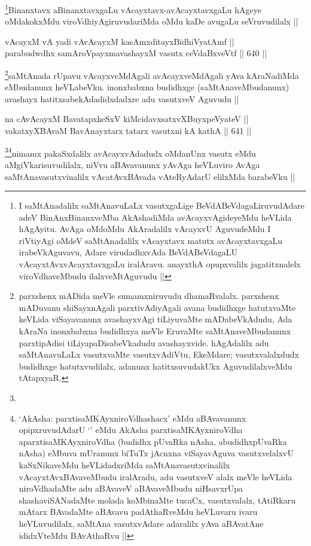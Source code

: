 \begin{artha}
\footnote{I saMtAnadalilx saMtAnavuLaLx vasutxgaLige BeVdABeVdagaLiruvudAdare adeV BinAnxBinanxveMba AkAshadiMda avAcayxvAgideyeMdu heVLida hAgAyitu. AvAga oMdoMdu AkAradalilx vAcayxvU AguvudeMdu I riVtiyAgi oMdeV saMtAnadalilx vAcayxtavx matutx avAcayxtavxgaLu irabeVkAguvavu, Adare virudadhxvAda BeVdABeVdagaLU vAcayxtAvxvAcayxtavxgaLu iralAravu. anayxthA opupxvalilx jagatitxnalelx viroVdhaveMbudu ilalxveMtAguvudu ||}Binanxtavx aBinanxtavxgaLu vAcayxtavx-avAcayxtavxgaLu hAgeye oMdakokxMdu viroVdhiyAgiruvudariMda oMdu kaDe avugaLu seVruvudilalx ||
\end{artha}

\begin{shl}
vAcayxM vA yadi vA\s vAcayxM kasAmxditayxBidhiVyatAmf || \\
parabudwdhx samAroVpayxmavashayxM vasutx ceVdaBxveVtf ||  640 ||  
\end{shl}

\begin{artha}
\footnote{parxshenx mADida meVle sumamxniruvudu dhamaRvalalx. parxshenx mADuvanu shiSayxnAgali parxtivAdiyAgali avana budidhxge hatutxvaMte keVLida viSayavanunx avashayxvAgi tiLiyuvaMte mADabeVkAdudu, Ada kAraNa inonxbabxna budidhxya meVle EruvaMte saMtAnaveMbudanunx parxtipAdisi tiLiyapaDisabeVkadudu avashayxvide. hAgAdalilx adu saMtAnavuLaLx vasutxvaMte vasutxvAdiVtu, EkeMdare; vasutxvalalxdudx budidhxge hatutxvudilalx, adanunx hatitxsuvudakUkx AguvudilalxveMdu tAtapxyaR.}saMtAnada rUpavu vAcayxveMdAgali avAcayxveMdAgali yAva kAraNadiMda eMbudanunx heVLabeVku. inonxbabxna budidhxge (saMtAnaveMbudanunx) avashayx hatitxsabekAdadidxdadxre adu vasutxveV Aguvudu ||
\end{artha}


\begin{shl}
na cAvAcayxM BavatapxkeSxV kiMcidavxsatxvXBuyxpeVyateV || \\
vakatxyXBAvaM BavAnayxtarx tatarx vasutxni kA kathA ||  641 ||  
\end{shl}

\begin{artha}
\footnote{}\footnote{`AkAsha: parxtisaMKAyxniroVdhashacx' eMdu aBAvavanunx opipxruvudAdarU `\stext' eMdu AkAsha parxtisaMKAyxniroVdha aparxtisaMKAyxniroVdha (budidhx pUvaRka nAsha, abudidhxpUvaRka nAsha) eMbuva mUranunx biTuTx jAcnxna viSayavAguva vasutxvelalxvU kaSxNikaveMdu heVLidadxriMda saMtAnavasutxvinalilx vAcayxtAvxBAvaveMbudu iralAradu, adu vasutxveV alalx meVle heVLida niroVdhadaMte adu aBAvaveV aBAvaveMbudu niHsavxrUpa shashaviSANadaMte molada koMbinaMte tucaCx, vasutxvalalx, tAtiRkaru mAtarx BAvadaMte aBAvavu padAthaRveMdu heVLuvaru ivaru heVLuvudilalx, saMtAna vasutxvAdare adaralilx yAva aBAvatAne ididxVteMdu BAvAthaRvu ||}nimamx pakaSxdalilx avAcayxvAdadudx oMdanUnx vasutx eMdu aMgiVkarisuvudilalx, niVvu aBAvavanunx yAvAga heVLuviro AvAga saMtAnavasutxvinalilx vAcatAvxBAvada vAteRyAdarU elilxMda barabeVku ||
\end{artha}

